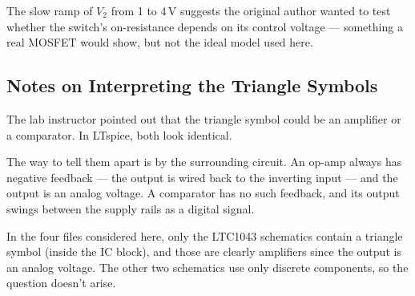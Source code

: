 The slow ramp of $V_2$ from 1 to 4\,V suggests the original author wanted to test whether the switch's on-resistance depends on its control voltage --- something a real MOSFET would show, but not the ideal model used here.

\subsection{Notes on Interpreting the Triangle Symbols}

The lab instructor pointed out that the triangle symbol could be an amplifier or a comparator. In LTspice, both look identical.

The way to tell them apart is by the surrounding circuit. An op-amp always has negative feedback --- the output is wired back to the inverting input --- and the output is an analog voltage. A comparator has no such feedback, and its output swings between the supply rails as a digital signal.

In the four files considered here, only the LTC1043 schematics contain a triangle symbol (inside the IC block), and those are clearly amplifiers since the output is an analog voltage. The other two schematics use only discrete components, so the question doesn't arise.